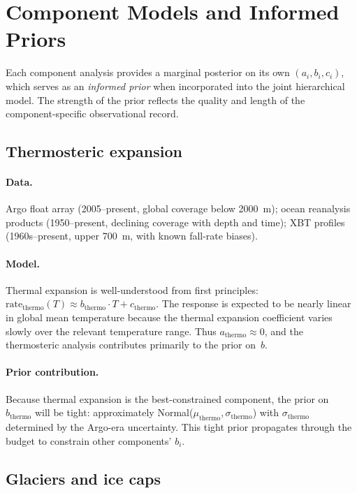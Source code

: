 \documentclass[11pt]{article}
\begin{document}
\section{Component Models and Informed Priors}
\label{sec:components}

Each component analysis provides a marginal posterior on its own $(a_i, b_i, c_i)$, which serves as an \emph{informed prior} when incorporated into the joint hierarchical model.  The strength of the prior reflects the quality and length of the component-specific observational record.

\subsection{Thermosteric expansion}
\label{sec:thermo}

\paragraph{Data.}  Argo float array (2005--present, global coverage below 2000~m); ocean reanalysis products (1950--present, declining coverage with depth and time); XBT profiles (1960s--present, upper 700~m, with known fall-rate biases).

\paragraph{Model.}  Thermal expansion is well-understood from first principles: $\text{rate}_{\text{thermo}}(T) \approx b_{\text{thermo}} \cdot T + c_{\text{thermo}}$.  The response is expected to be nearly linear in global mean temperature because the thermal expansion coefficient varies slowly over the relevant temperature range.  Thus $a_{\text{thermo}} \approx 0$, and the thermosteric analysis contributes primarily to the prior on~$b$.

\paragraph{Prior contribution.}  Because thermal expansion is the best-constrained component, the prior on $b_{\text{thermo}}$ will be tight: approximately Normal($\mu_{\text{thermo}}, \sigma_{\text{thermo}}$) with $\sigma_{\text{thermo}}$ determined by the Argo-era uncertainty.  This tight prior propagates through the budget to constrain other components' $b_i$.

\subsection{Glaciers and ice caps}
\label{sec:glaciers}
\end{document}
